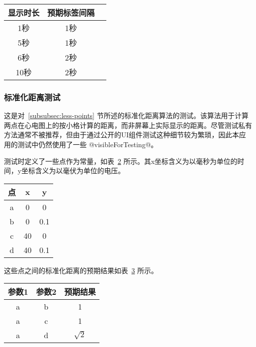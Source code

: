 \begin{table}[!ht]
    \centering
    \label{tab:label-interval}
    \begin{tabular}{|c|c|c|}
        \hline
        显示时长 & 预期标签间隔 \\
        \hline
        1秒   & 1秒     \\
        \hline
        5秒   & 1秒     \\
        \hline
        6秒   & 2秒     \\
        \hline
        10秒  & 2秒     \\
        \hline
    \end{tabular}
\end{table}

\subsubsection{标准化距离测试}

这是对~\ref{subsubsec:less-points} 节所述的标准化距离算法的测试。该算法用于计算两点在心电图上的按小格计算的距离，而非屏幕上实际显示的距离。尽管测试私有方法通常不被推荐，但由于通过公开的UI组件测试这种细节较为繁琐，因此本应用的测试中仍然使用了一些 @visibleForTesting@。

测试时定义了一些点作为常量，如表~\ref{tab:spots} 所示。其x坐标含义为以毫秒为单位的时间，y坐标含义为以毫伏为单位的电压。

\begin{table}[!ht]
    \centering
    \label{tab:spots}
    \begin{tabular}{|c|c|c|}
        \hline
        点 & x  & y   \\
        \hline
        a & 0  & 0   \\
        \hline
        b & 0  & 0.1 \\
        \hline
        c & 40 & 0   \\
        \hline
        d & 40 & 0.1 \\
        \hline
    \end{tabular}
\end{table}

这些点之间的标准化距离的预期结果如表~\ref{tab:expected-distance} 所示。

\begin{table}[!ht]
    \centering
    \label{tab:expected-distance}
    \begin{tabular}{|c|c|c|}
        \hline
        参数1 & 参数2 & 预期结果         \\
        \hline
        a   & b   & 1            \\
        \hline
        a   & c   & 1            \\
        \hline
        a   & d   & \(\sqrt{2}\) \\
        \hline
    \end{tabular}
\end{table}

